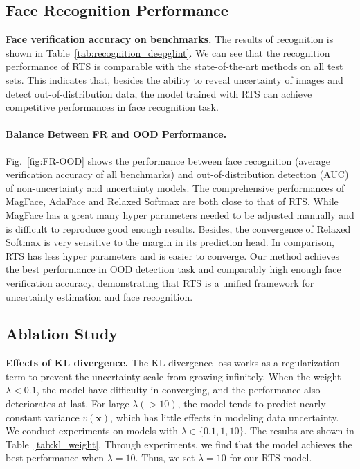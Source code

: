 \documentclass[letterpaper]{article} %
\begin{document}
\vspace{-1.43mm}
\vspace{-0.75mm}
\vspace{-2.18mm}
\subsection{Face Recognition Performance}
\label{ssec:face recognition}
\textbf{Face verification accuracy on benchmarks.} The results of recognition is shown in Table~\ref{tab:recognition_deepglint}. We can see that the recognition performance of RTS is comparable with the state-of-the-art methods on all test sets. This indicates that, besides the ability to reveal uncertainty of images and detect out-of-distribution data, the model trained with RTS can achieve competitive performances in face recognition task.

\paragraph{Balance Between FR and OOD Performance. } Fig.~\ref{fig:FR-OOD} shows the performance between face recognition (average verification accuracy of all benchmarks) and out-of-distribution detection (AUC) of non-uncertainty and uncertainty models. The comprehensive performances of MagFace, AdaFace and Relaxed Softmax are both close to that of RTS. While MagFace has a great many hyper parameters needed to be adjusted manually and is difficult to reproduce good enough results. Besides, the convergence of Relaxed Softmax is very sensitive to the margin in its prediction head. In comparison, RTS has less hyper parameters and is easier to converge. Our method achieves the best performance in OOD detection task and comparably high enough face verification accuracy, demonstrating that RTS is a unified framework for uncertainty estimation and face recognition.










\vspace{-0.72mm}
\subsection{Ablation Study}
\label{ssec:ablation}

\textbf{Effects of KL divergence.} The KL divergence loss works as a regularization term to prevent the uncertainty scale from growing infinitely. When the weight $\lambda < 0.1$, the model have difficulty in converging, and the performance also deteriorates at last.
For large $\lambda (>10)$, the model tends to predict nearly constant variance $v(\bm{x})$, which has little effects in modeling data uncertainty.
We conduct experiments on models with $\lambda \in \{0.1, 1, 10\}$. The results are shown in Table~\ref{tab:kl_weight}.
Through experiments, we find that the model achieves the best performance when $\lambda = 10$. Thus, we set $\lambda = 10$ for our RTS model.
\end{document}
